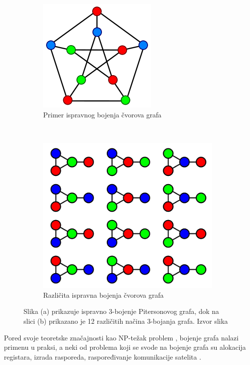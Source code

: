 \documentclass[a4paper]{article}
\begin{document}
\begin{figure}[h!]
	\centering

	\begin{subfigure}[normla]{0.3\textwidth}
		\includegraphics[scale=0.3]{bojene_grafa1}
		\caption{Primer ispravnog bojenja čvorova grafa}
		\label{bojenje_grafa1}
	\end{subfigure}
	~
	\begin{subfigure}[normla]{0.3\textwidth}
		\includegraphics[scale=0.1]{bojenje_grafa2}
		\caption{Različita ispravna bojenja čvorova grafa}
		\label{bojenje_grafa2}
	\end{subfigure}
		\caption{Slika (a) prikazuje ispravno 3-bojenje Pitersonovog grafa, dok na slici (b) prikazano je 12 različitih načina 3-bojanja grafa. Izvor slika \cite{graph_coloring} }
\label{bojene_grafa}
\end{figure}

Pored svoje teoretske značajnosti kao NP-težak problem \cite{zivkovic_algoritmi}, bojenje grafa nalazi primenu u praksi, a neki od problema koji se svode na bojenje grafa su alokacija registara, izrada rasporeda, raspoređivanje komunikacije satelita \cite{lu2010memetic}.
\end{document}
